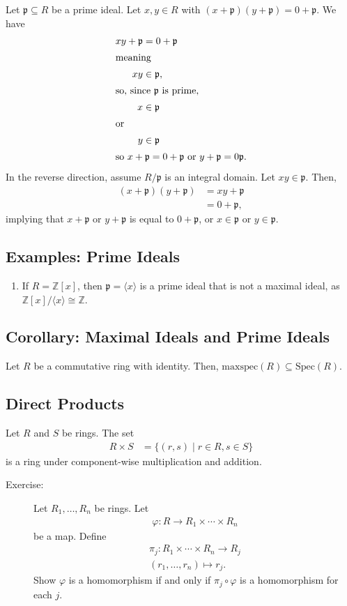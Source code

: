 \documentclass[10pt]{extarticle}
\newcommand{\Z}{\mathbb{Z}}
\begin{document}
  Let $\mathfrak{p}\subseteq R$ be a prime ideal. Let $x,y\in R$ with $(x+\mathfrak{p})(y + \mathfrak{p}) = 0 + \mathfrak{p}$. We have
  \begin{align*}
    xy + \mathfrak{p} &= 0 + \mathfrak{p}\\
    \intertext{meaning}
    xy &\in \mathfrak{p},\\
    \intertext{so, since $\mathfrak{p}$ is prime,}
    x&\in \mathfrak{p}\\
    \intertext{or}
    y&\in \mathfrak{p}\\
    \intertext{so $x + \mathfrak{p} = 0 + \mathfrak{p}$ or $y + \mathfrak{p} = 0\mathfrak{p}$.}
  \end{align*}
  In the reverse direction, assume $R/\mathfrak{p}$ is an integral domain. Let $xy\in \mathfrak{p}$. Then,
  \begin{align*}
    (x+\mathfrak{p})  (y + \mathfrak{p}) &= xy + \mathfrak{p}\\
                                         &= 0 + \mathfrak{p},
  \end{align*}
  implying that $x + \mathfrak{p}$ or $y + \mathfrak{p}$ is equal to $0 + \mathfrak{p}$, or $x \in \mathfrak{p}$ or $y\in \mathfrak{p}$.
  \subsection{Examples: Prime Ideals}%
  \begin{enumerate}[(1)]
    \item If $R = \Z[x]$, then $\mathfrak{p} = \langle x \rangle$ is a prime ideal that is not a maximal ideal, as $\Z[x]/\langle x \rangle\cong \Z$.
  \end{enumerate}
  \subsection{Corollary: Maximal Ideals and Prime Ideals}%
  Let $R$ be a commutative ring with identity. Then, $\text{maxspec}(R)\subseteq \text{Spec}(R)$.
  \subsection{Direct Products}%
  Let $R$ and $S$ be rings. The set
  \begin{align*}
    R\times S &= \{(r,s)\mid r\in R, s\in S\}
  \end{align*}
   is a ring under component-wise multiplication and addition.
   \begin{description}
     \item[Exercise:] Let $R_1,\dots,R_n$ be rings. Let 
       \begin{align*}
         \varphi: R\rightarrow R_1\times \cdots \times R_n
       \end{align*}
      be a map. Define
      \begin{align*}
        \pi_j: R_1\times\cdots\times R_n \rightarrow R_j\\
        (r_1,\dots,r_n)\mapsto r_j.
      \end{align*}
      Show $\varphi$ is a homomorphism if and only if $\pi_j\circ \varphi$ is a homomorphism for each $j$.
   \end{description}
\end{document}
